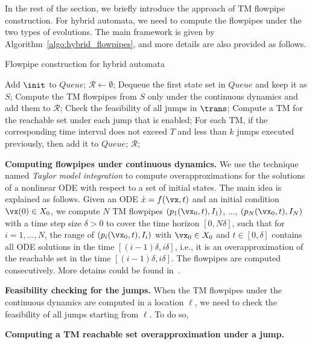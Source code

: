 In the rest of the section, we briefly introduce the approach of TM flowpipe construction. For hybrid automata, we need to compute the flowpipes under the two types of evolutions. The main framework is given by Algorithm~\ref{algo:hybrid_flowpipes}, and more details are also provided as follows.


\begin{algorithm}
 \caption{Flowpipe construction for hybrid automata}\label{algo:hybrid_flowpipes}
 \begin{algorithmic}[1]
  \STATE Add $\init$ to $\textit{Queue}$;
  \STATE $\mathcal{R} \leftarrow \emptyset$;
   \STATE Dequeue the first state set in $\textit{Queue}$ and keep it as $S$;
   \STATE Compute the TM flowpipes from $S$ only under the continuous dynamics and add them to $\mathcal{R}$;
   \STATE Check the feasibility of all jumps in $\trans$;
   \STATE Compute a TM for the reachable set under each jump that is enabled;
   \STATE For each TM, if the corresponding time interval does not exceed $T$ and less than $k$ jumps executed previously, then add it to $\textit{Queue}$;
  \ENDWHILE
  \RETURN $\mathcal{R}$;
 \end{algorithmic}
\end{algorithm}


\noindent\textbf{Computing flowpipes under continuous dynamics.}
We use the technique named \emph{Taylor model integration} to compute overapproximations for the solutions of a nonlinear ODE with respect to a set of initial states. The main idea is explained as follows. Given an ODE $\dot{x} = f(\vx,t)$ and an initial condition $\vx(0) \in X_0$, we compute $N$ TM flowpipes $(p_1(\vx_0,t), I_1)$, $\dots$, $(p_N(\vx_0,t), I_N)$ with a time step size $\delta > 0$ to cover the time horizon $[0,N\delta]$, such that for $i=1,\dots,N$, the range of $(p_i(\vx_0,t), I_i)$ with $\vx_0\in X_0$ and $t\in [0,\delta]$ contains all ODE solutions in the time $[(i-1)\delta, i\delta]$, i.e., it is an overapproximation of the reachable set in the time $[(i-1)\delta, i\delta]$. The flowpipes are computed consecutively. More detains could be found in~\cite{Berz+Makino/1998/Verified, Chen/2015/phd}.


\noindent\textbf{Feasibility checking for the jumps.}
When the TM flowpipes under the continuous dynamics are computed in a location $\ell$, we need to check the feasibility of all jumps starting from $\ell$. To do so,




\noindent\textbf{Computing a TM reachable set overapproximation under a jump.}



